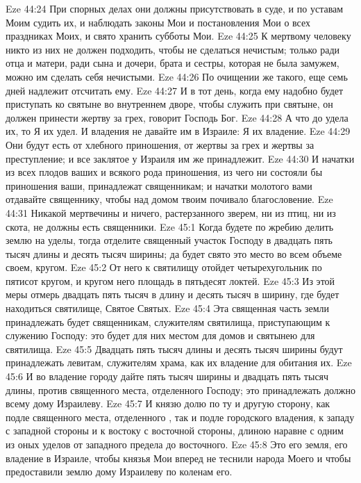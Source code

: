 \vs Eze 44:24 При спорных делах они должны присутствовать в суде, и по уставам Моим судить их, и наблюдать законы Мои и постановления Мои о всех праздниках Моих, и свято хранить субботы Мои.
\vs Eze 44:25 К мертвому человеку никто из них не должен подходить, чтобы не сделаться нечистым; только ради отца и матери, ради сына и дочери, брата и сестры, которая не была замужем, можно им сделать себя нечистыми.
\vs Eze 44:26 По очищении же такого, еще семь дней надлежит отсчитать ему.
\vs Eze 44:27 И в тот день, когда ему надобно будет приступать ко святыне во внутреннем дворе, чтобы служить при святыне, он должен принести жертву за грех, говорит Господь Бог.
\vs Eze 44:28 А что до удела их, то Я их удел. И владения не давайте им в Израиле: Я их владение.
\vs Eze 44:29 Они будут есть от хлебного приношения, от жертвы за грех и жертвы за преступление; и все заклятое у Израиля им же принадлежит.
\vs Eze 44:30 И начатки из всех плодов ваших и всякого рода приношения, из чего ни состояли бы приношения ваши, принадлежат священникам; и начатки молотого вами отдавайте священнику, чтобы над домом твоим почивало благословение.
\vs Eze 44:31 Никакой мертвечины и ничего, растерзанного зверем, ни из птиц, ни из скота, не должны есть священники.
\vs Eze 45:1 Когда будете по жребию делить землю на уделы, тогда отделите священный участок Господу в двадцать пять тысяч  длины и десять тысяч ширины; да будет свято это место во всем объеме своем, кругом.
\vs Eze 45:2 От него к святилищу отойдет четырехугольник по пятисот  кругом, и кругом него площадь в пятьдесят локтей.
\vs Eze 45:3 Из этой меры отмерь двадцать пять тысяч  в длину и десять тысяч в ширину, где будет находиться святилище, Святое Святых.
\vs Eze 45:4 Эта священная часть земли принадлежать будет священникам, служителям святилища, приступающим к служению Господу: это будет для них местом для домов и святынею для святилища.
\vs Eze 45:5 Двадцать пять тысяч  длины и десять тысяч ширины будут принадлежать левитам, служителям храма, как их владение для обитания их.
\vs Eze 45:6 И во владение городу дайте пять тысяч ширины и двадцать пять тысяч длины, против священного места, отделенного Господу; это принадлежать должно всему дому Израилеву.
\vs Eze 45:7 И князю  долю по ту и другую сторону, как подле священного места, отделенного , так и подле городского владения, к западу с западной стороны и к востоку с восточной стороны, длиною наравне с одним из оных уделов от западного предела до восточного.
\vs Eze 45:8 Это его земля, его владение в Израиле, чтобы князья Мои вперед не теснили народа Моего и чтобы предоставили землю дому Израилеву по коленам его.
